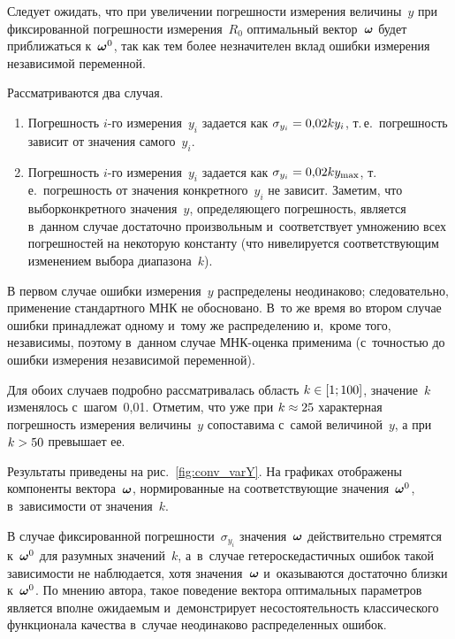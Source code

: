 \begin{multicols}{2}
Следует ожидать, что при увеличении погрешности измерения величины~$y$ при
фиксированной погрешности измерения~$R_0$ оптимальный вектор~$\boldsymbol{\omega}$
будет приближаться к~$\boldsymbol{\omega}^0$, так как тем более незначителен
вклад ошибки измерения независимой переменной.

Рассматриваются два случая.
\begin{enumerate}
  \item Погрешность $i$-го измерения~$y_i$ задается как $\sigma_{y_i} \hm= 
0{,}02ky_i$, т.\,е.\     погрешность зависит от значения самого~$y_i$.
  \item Погрешность $i$-го измерения~$y_i$ задается как $\sigma_{y_i} \hm= 
0{,}02ky_{\max}$,
    т.\,е.\ погрешность от значения конкретного~$y_i$ не зависит. Заметим, что 
выбор\linebreak конкретного значения~$y$, определяющего %
погрешность, является в~данном 
случае  достаточ\-но произвольным и~соответствует умножению всех погрешностей на 
некоторую константу     (что нивелируется соответствующим изменением выбора диапазона~$k$).
\end{enumerate}

В первом случае ошибки измерения~$y$ распределены неодинаково; следовательно, 
применение стандартного МНК не обосно\-ва\-но. В~то же время во втором 
случае ошибки принадлежат одному и~тому же распределению и,~кроме того, независимы, 
поэтому в~данном случае МНК-оцен\-ка применима (с~точностью до ошибки измерения 
независимой переменной).

Для обоих случаев подробно рассматривалась область $k\hm \in [1; 100]$, значение~$k$
изменялось с~шагом~0,01. Отметим, что уже при $k \hm\approx 25$ характерная 
погрешность измерения величины~$y$ сопоставима с~самой величиной~$y$, а при $k \hm> 50$ 
превышает ее.

Результаты приведены на рис.~\ref{fig:conv_varY}.
На графиках отображены компоненты вектора~$\boldsymbol{\omega}$, нормированные на
соответствующие значения~$\boldsymbol{\omega}^0$, в~за\-ви\-си\-мости от значения~$k$.



В случае фиксированной погрешности~$\sigma_{y_i}$ значения~$\boldsymbol{\omega}$
действительно стремятся к~$\boldsymbol{\omega}^0$ для разумных значений~$k$, а~в~случае
гетероскедастичных ошибок такой зависимости не наблюдается, хотя значения~$\boldsymbol{\omega}$
и~оказываются достаточно близки к~$\boldsymbol{\omega}^0$. По мнению автора, такое поведение
вектора оптимальных параметров является вполне ожидаемым и~демонстрирует
несостоятельность классического функционала качества в~случае неодинаково
распределенных ошибок.


\end{multicols}
